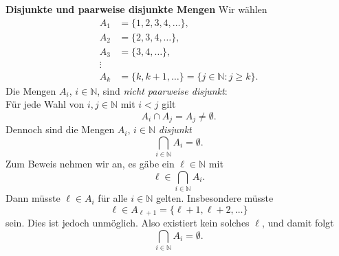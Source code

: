 \begin{bsp}
    \textbf{Disjunkte und paarweise disjunkte Mengen} 
    Wir wählen
    \begin{align*}
        A_1 & =\{1,2,3,4,\dots\}, \\
        A_2 & =\{2,3,4,\dots\}, \\
        A_3 & =\{3,4,\dots\}, \\
        \vdots \\
        A_k & =\{k,k+1,\dots\}=\{j\in\mathbb{N}:j\ge k\}.
    \end{align*}
    Die Mengen \(A_i\), \(i\in\mathbb{N}\), sind \emph{nicht paarweise disjunkt}:\\
    Für jede Wahl von \(i,j\in\mathbb{N}\) mit \( i < j \) gilt
    \[
        A_i\cap A_j=A_j\neq\emptyset.
    \]
    Dennoch sind die Mengen \(A_i\), \(i\in\mathbb{N}\) \textit{disjunkt}
    \[
        \bigcap_{i\in\mathbb{N}}A_i=\emptyset.
    \]
    Zum Beweis nehmen wir an, es gäbe ein \(\ell\in\mathbb{N}\) mit
    \[
        \ell\in\bigcap_{i\in\mathbb{N}}A_i.
    \]
    Dann müsste \(\ell\in A_i\) für alle \(i\in\mathbb{N}\) gelten. Insbesondere müsste
    \[
        \ell\in A_{\ell+1}=\{\ell+1,\ell+2,\dots\}
    \]
    sein. Dies ist jedoch unmöglich. Also existiert kein solches
    \(\ell\), und damit folgt
    \[
        \bigcap_{i\in\mathbb{N}}A_i=\emptyset.
    \]
\end{bsp}



